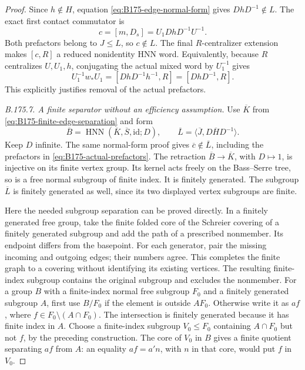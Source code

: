 \begin{proof}
Since \(h\notin H\), equation \eqref{eq:B175-edge-normal-form} gives
\(DhD^{-1}\notin L\). The exact first contact commutator is
\begin{equation}\label{eq:B175-actual-prefactors}
 c=[m,D_s]=U_1DhD^{-1}U^{-1}.
\end{equation}
Both prefactors belong to \(J\le L\), so \(c\notin L\).
The final \(R\)-centralizer extension makes \([c,R]\) a reduced
nonidentity HNN word. Equivalently, because \(R\) centralizes
\(U,U_1,h\), conjugating the actual mixed word by \(U_1^{-1}\)
gives
\[
 U_1^{-1}w_*U_1=[DhD^{-1}h^{-1},R]=[DhD^{-1},R].
\]
This explicitly justifies removal of the actual prefactors.

\emph{B.175.7. A finite separator without an efficiency assumption.}
Use \(\overline K\) from \eqref{eq:B175-finite-edge-separation} and form
\[
 \overline B=\operatorname{HNN}
       (\overline K,\overline S,\mathrm{id};D),
 \qquad
 \overline L=\langle\overline J,D\overline H D^{-1}\rangle.
\]
Keep \(D\) infinite. The same normal-form proof gives
\(\overline c\notin\overline L\), including the prefactors in
\eqref{eq:B175-actual-prefactors}.
The retraction \(\overline B\to\overline K\), with \(D\mapsto1\),
is injective on its finite vertex group. Its kernel acts freely on
the Bass--Serre tree, so is a free normal subgroup of finite index.
It is finitely generated. The subgroup \(\overline L\) is finitely
generated as well, since its two displayed vertex subgroups are finite.

Here the needed subgroup separation can be proved directly.
In a finitely generated free group, take the finite folded core of the
Schreier covering of a finitely generated subgroup and add the path of
a prescribed nonmember. Its endpoint differs from the basepoint.
For each generator, pair the missing incoming and outgoing edges;
their numbers agree. This completes the finite graph to a covering
without identifying its existing vertices. The resulting finite-index
subgroup contains the original subgroup and excludes the nonmember.
For a group \(B\) with a finite-index normal free subgroup \(F_0\)
and a finitely generated subgroup \(A\), first use \(B/F_0\) if the
element is outside \(AF_0\). Otherwise write it as \(af\), where
\(f\in F_0\setminus(A\cap F_0)\).
The intersection is finitely generated because it has finite index
in \(A\). Choose a finite-index subgroup \(V_0\le F_0\) containing
\(A\cap F_0\) but not \(f\), by the preceding construction.
The core of \(V_0\) in \(B\) gives a finite quotient separating
\(af\) from \(A\): an equality \(af=a'n\), with \(n\) in that
core, would put \(f\) in \(V_0\).


\end{proof}
